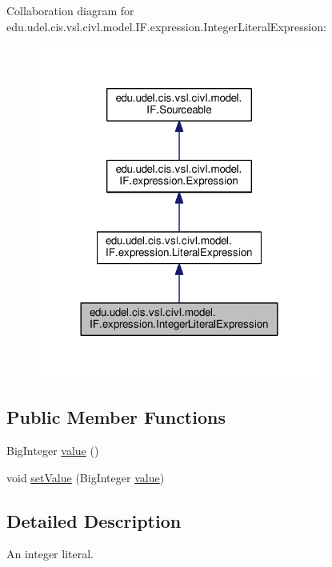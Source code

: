 Collaboration diagram for edu.\+udel.\+cis.\+vsl.\+civl.\+model.\+I\+F.\+expression.\+Integer\+Literal\+Expression\+:
\nopagebreak
\begin{figure}[H]
\begin{center}
\leavevmode
\includegraphics[width=264pt]{interfaceedu_1_1udel_1_1cis_1_1vsl_1_1civl_1_1model_1_1IF_1_1expression_1_1IntegerLiteralExpression__coll__graph}
\end{center}
\end{figure}
\subsection*{Public Member Functions}
\begin{DoxyCompactItemize}
\item 
Big\+Integer \hyperlink{interfaceedu_1_1udel_1_1cis_1_1vsl_1_1civl_1_1model_1_1IF_1_1expression_1_1IntegerLiteralExpression_a45e3959ef8f1260c11738a613bed251a}{value} ()
\item 
void \hyperlink{interfaceedu_1_1udel_1_1cis_1_1vsl_1_1civl_1_1model_1_1IF_1_1expression_1_1IntegerLiteralExpression_a0fb0613d3e054bbeb6246a037490458c}{set\+Value} (Big\+Integer \hyperlink{interfaceedu_1_1udel_1_1cis_1_1vsl_1_1civl_1_1model_1_1IF_1_1expression_1_1IntegerLiteralExpression_a45e3959ef8f1260c11738a613bed251a}{value})
\end{DoxyCompactItemize}


\subsection{Detailed Description}
An integer literal. 

